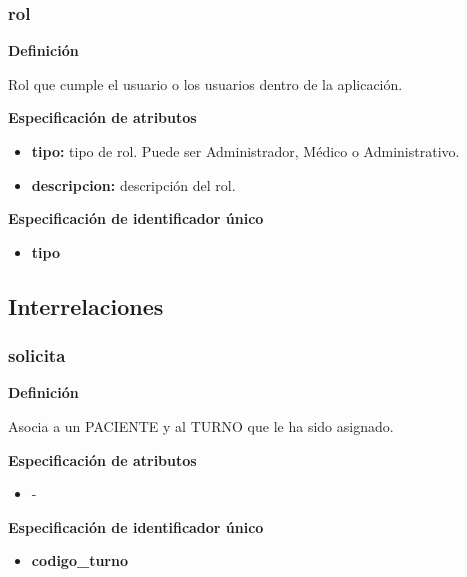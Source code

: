 \documentclass[a4paper,11pt]{article}
\begin{document}
\subsubsection{\textbf{rol}}

\textbf{Definición}

Rol que cumple el usuario o los usuarios dentro de la aplicación.

\textbf{Especificación de atributos}

\begin{itemize}

     \item \textbf{tipo:} tipo de rol. Puede ser Administrador, Médico o Administrativo. 
	 
     \item \textbf{descripcion:} descripción del rol. 

\end{itemize}

\textbf{Especificación de identificador único}

\begin{itemize}

     \item \textbf{tipo}

\end{itemize}



\subsection{\textbf{Interrelaciones}}

\subsubsection{\textbf{solicita}}

\textbf{Definición}

Asocia a un PACIENTE y al TURNO que le ha sido asignado.

\textbf{Especificación de atributos}

\begin{itemize}
\item -
\end{itemize}


\textbf{Especificación de identificador único}

\begin{itemize}

     \item \textbf{codigo\_turno}

\end{itemize}
\end{document}
